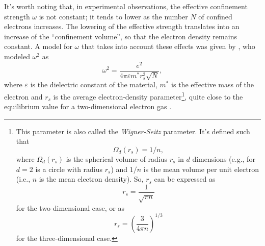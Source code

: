 It's worth noting that, in experimental observations, the effective confinement strength $\omega$ is not constant; it tends to lower as the number $N$ of confined electrons increases. The lowering of the effective strength translates into an increase of the ``confinement volume'', so that the electron density remains constant. A model for $\omega$ that takes into account these effects was given by \cite{Koskinen1997}, who modeled $\omega^2$ as
\begin{equation}
	\omega^2 = \frac{e^2}{4\pi\varepsilon m^*r_s^3\sqrt{N}},
\end{equation}
where $\varepsilon$ is the dielectric constant of the material, $m^*$ is the effective mass of the electron and $r_s$ is the average electron-density parameter\footnote{
	This parameter is also called the \emph{Wigner-Seitz} parameter. It's defined such that
	\begin{equation*}
		\Omega_d(r_s) = 1/n,
	\end{equation*}
	where $\Omega_d(r_s)$ is the spherical volume of radius $r_s$ in $d$ dimensions (e.g., for $d=2$ is a circle with radius $r_s$) and $1/n$ is the mean volume per unit electron (i.e., $n$ is the mean electron density). So, $r_s$ can be expressed as
	\begin{equation*}
		r_s = \frac{1}{\sqrt{\pi n}}
	\end{equation*}
	for the two-dimensional case, or as
	\begin{equation*}
		r_s = \left(\frac{3}{4\pi n}\right)^{1/3}
	\end{equation*}
	for the three-dimensional case.
},
quite close to the equilibrium value  for a two-dimensional electron gas \citep[see][]{Reimann2002}.
